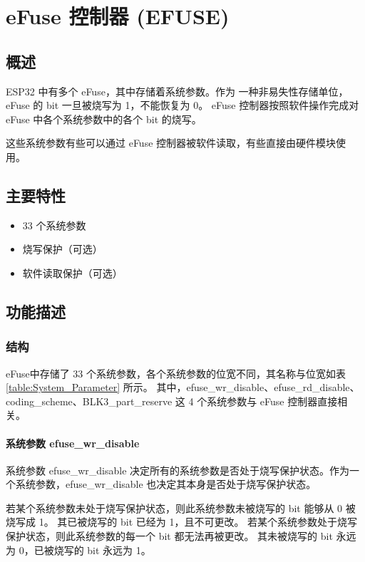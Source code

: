 \documentclass[main\_\_CN.tex]{subfiles}
\begin{document}
\hypertarget{efuse}{}
\chapter{eFuse 控制器 (EFUSE)}
\label{mod:efuse}
\section{概述}

ESP32 中有多个 eFuse，其中存储着系统参数。作为 一种非易失性存储单位，
eFuse 的 bit 一旦被烧写为 1，不能恢复为 0。
eFuse 控制器按照软件操作完成对 eFuse 中各个系统参数中的各个 bit 的烧写。

这些系统参数有些可以通过 eFuse 控制器被软件读取，有些直接由硬件模块使用。

\section{主要特性}
\begin{itemize}
    \item 33 个系统参数
    \item 烧写保护（可选）
    \item 软件读取保护（可选）
\end{itemize}

\section{功能描述}

\subsection{结构}\label{20.3.1}
eFuse中存储了 33 个系统参数，各个系统参数的位宽不同，其名称与位宽如表 \ref{table:System_Parameter} 所示。
其中，efuse\_wr\_disable、efuse\_rd\_disable、coding\_scheme、BLK3\_part\_reserve 这 4 个系统参数与 eFuse 控制器直接相关。



\subsubsection{系统参数 efuse\_wr\_disable}

系统参数 efuse\_wr\_disable 决定所有的系统参数是否处于烧写保护状态。作为一个系统参数，efuse\_wr\_disable 也决定其本身是否处于烧写保护状态。

若某个系统参数未处于烧写保护状态，则此系统参数未被烧写的 bit 能够从 0 被烧写成 1。
其已被烧写的 bit 已经为 1，且不可更改。
若某个系统参数处于烧写保护状态，则此系统参数的每一个 bit 都无法再被更改。
其未被烧写的 bit 永远为 0，已被烧写的 bit 永远为 1。
\end{document}
